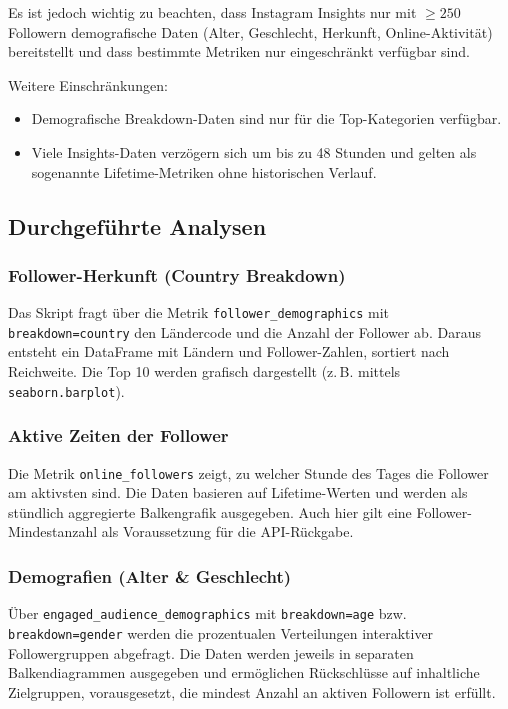 \documentclass[a4paper,12pt]{article}
\begin{document}
Es ist jedoch wichtig zu beachten, dass Instagram Insights nur mit $ \geq 250 $ Followern demografische Daten (Alter, Geschlecht, Herkunft, Online-Aktivität) bereitstellt und dass bestimmte Metriken nur eingeschränkt verfügbar sind.

Weitere Einschränkungen:
\begin{itemize}
    \item Demografische Breakdown-Daten sind nur für die Top-Kategorien verfügbar.
    \item Viele Insights-Daten verzögern sich um bis zu 48 Stunden und gelten als sogenannte Lifetime-Metriken ohne historischen Verlauf.
\end{itemize}

\subsection{Durchgeführte Analysen}

\subsubsection*{Follower-Herkunft (Country Breakdown)}

Das Skript fragt über die Metrik \texttt{follower\_demographics} mit \texttt{breakdown=country} den Ländercode und die Anzahl der Follower ab. Daraus entsteht ein DataFrame mit Ländern und Follower-Zahlen, sortiert nach Reichweite. Die Top 10 werden grafisch dargestellt (z.\,B. mittels \texttt{seaborn.barplot}).

\subsubsection*{Aktive Zeiten der Follower}

Die Metrik \texttt{online\_followers} zeigt, zu welcher Stunde des Tages die Follower am aktivsten sind. Die Daten basieren auf Lifetime-Werten und werden als stündlich aggregierte Balkengrafik ausgegeben. Auch hier gilt eine Follower-Mindestanzahl als Voraussetzung für die API-Rückgabe.

\subsubsection*{Demografien (Alter \& Geschlecht)}

Über \texttt{engaged\_audience\_demographics} mit \texttt{breakdown=age} bzw. \texttt{breakdown=gender} werden die prozentualen Verteilungen interaktiver Followergruppen abgefragt. Die Daten werden jeweils in separaten Balkendiagrammen ausgegeben und ermöglichen Rückschlüsse auf inhaltliche Zielgruppen, vorausgesetzt, die mindest Anzahl an aktiven Followern ist erfüllt.
\end{document}
